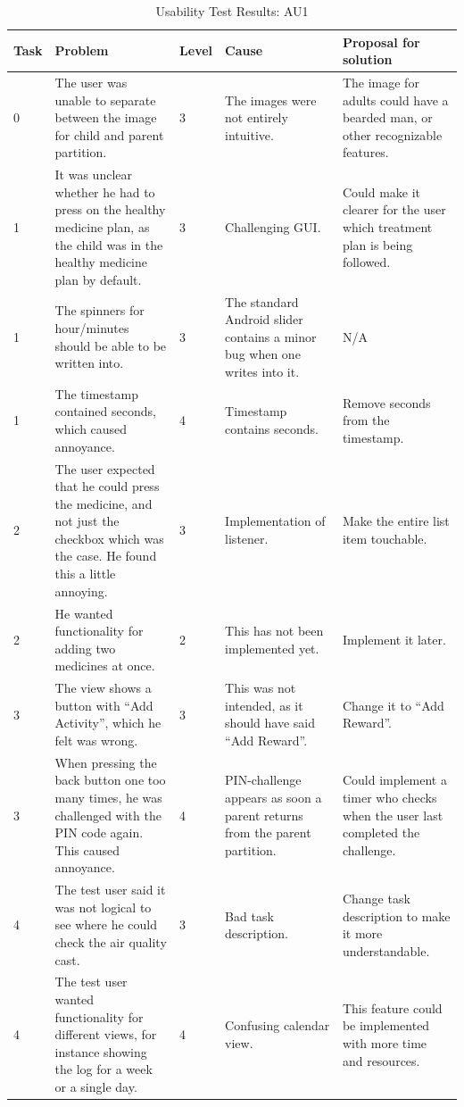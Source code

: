 \begin{singlespacing}
\begin{table}[H]
\centering
\begin{tabular}{| p{0.7cm} | p{4.0cm} | p{0.9cm} | p{3.7cm} | p{3.3cm} |}
\hline
	\textbf{Task} & \textbf{Problem} & \textbf{Level} & \textbf{Cause} & \textbf{Proposal for solution} \\
	\hline
	0 & The user was unable to separate between the image for child and parent partition. & 3 & The images were not entirely intuitive. & The image for adults could have a bearded man, or other recognizable features. \\
	\hline
	1 & It was unclear whether he had to press on the healthy medicine plan, as the child was in the healthy medicine plan by default. & 3 & Challenging GUI. & Could make it clearer for the user which treatment plan is being followed. \\
	\hline
	1 & The spinners for hour/minutes should be able to be written into. & 3 & The standard Android slider contains a minor bug when one writes into it.  & N/A \\
	\hline
	1 & The timestamp contained seconds, which caused annoyance. & 4 & Timestamp contains seconds. & Remove seconds from the timestamp. \\
	\hline
	2 & The user expected that he could press the medicine, and not just the checkbox which was the case. He found this a little annoying. & 3 & Implementation of listener. & Make the entire list item touchable. \\
	\hline
	2 & He wanted functionality for adding two medicines at once. & 2 & This has not been implemented yet. & Implement it later. \\
	\hline
	3 & The view shows a button with ``Add Activity'', which he felt was wrong. & 3 & This was not intended, as it should have said ``Add Reward''. & Change it to ``Add Reward''. \\
	\hline
	3 & When pressing the back button one too many times, he was challenged with the PIN code again. This caused annoyance. & 4 & PIN-challenge appears as soon a parent returns from the parent partition. & Could implement a timer who checks when the user last completed the challenge.\\
	\hline
	4 & The test user said it was not logical to see where he could check the air quality cast. & 3 & Bad task description. & Change task description to make it more understandable. \\
	\hline
	4 & The test user wanted functionality for different views, for instance showing the log for a week or a single day. & 4 & Confusing calendar view. & This feature could be implemented with more time and resources.  \\
	\hline
\end{tabular}
\caption{Usability Test Results: AU1}
\label{tab:testadult1}
\end{table}
\end{singlespacing}


